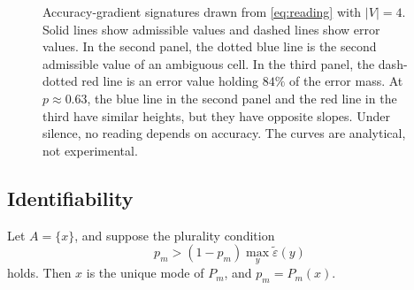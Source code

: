 \begin{figure}[t]
\centering
{}
\caption{Accuracy-gradient signatures drawn from \cref{eq:reading} with $|V|=4$. Solid lines show admissible values and dashed lines show error values. In the second panel, the dotted blue line is the second admissible value of an ambiguous cell. In the third panel, the dash-dotted red line is an error value holding $84\%$ of the error mass. At $p\approx0.63$, the blue line in the second panel and the red line in the third have similar heights, but they have opposite slopes. Under silence, no reading depends on accuracy. The curves are analytical, not experimental.}
\label{fig:signatures}
\end{figure}

\subsection{Identifiability}

\begin{theorem}
\label{thm:t1}
Let $A=\{x\}$, and suppose the plurality condition
\begin{equation}
\label{eq:pc}
p_m>(1-p_m)\max_{y}\tilde\varepsilon(y)\tag{PC$_m$}
\end{equation}
holds. Then $x$ is the unique mode of $P_m$, and $p_m=P_m(x)$.
\end{theorem}

